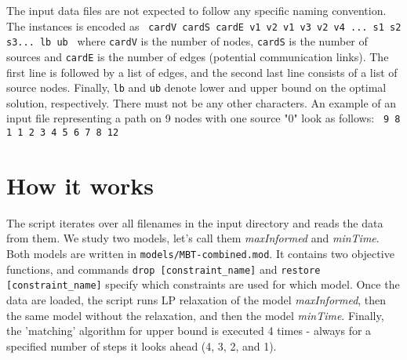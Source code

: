 \documentclass[12pt]{article}
\begin{document}
The input data files are not expected to follow any specific naming convention.
The instances is encoded as \newline\newline
\texttt{
cardV cardS cardE\newline
v1 v2\newline
v1 v3\newline
v2 v4\newline
...\newline
s1 s2 s3...\newline
lb ub\newline\newline
}
where \texttt{cardV} is the number of nodes, \texttt{cardS} is the number of sources and \texttt{cardE} is the number of edges (potential communication links).
The first line is followed by a list of edges, and the second last line consists of a list of source nodes.
Finally, \texttt{lb} and \texttt{ub} denote lower and upper bound on the optimal solution, respectively.
There must not be any other characters.
An example of an input file representing a path on 9 nodes with one source "0" look as follows:\newline\newline
\texttt{
9	8	1	1	2	3	4	5	6	7	8	12\newline\newline
}

\section{How it works}

The script iterates over all filenames in the input directory and reads the data from them.
We study two models, let's call them \emph{maxInformed} and \emph{minTime}.
Both models are written in \texttt{models/MBT-combined.mod}.
It contains two objective functions, and commands \texttt{drop [constraint\_name]} and \texttt{restore [constraint\_name]} specify which constraints are used for which model. 
Once the data are loaded, the script runs LP relaxation of the model \emph{maxInformed}, then the same model without the relaxation, and then the model \emph{minTime}.
Finally, the 'matching' algorithm for upper bound is executed 4 times - always for a specified number of steps it looks ahead (4, 3, 2, and 1). 
\end{document}
